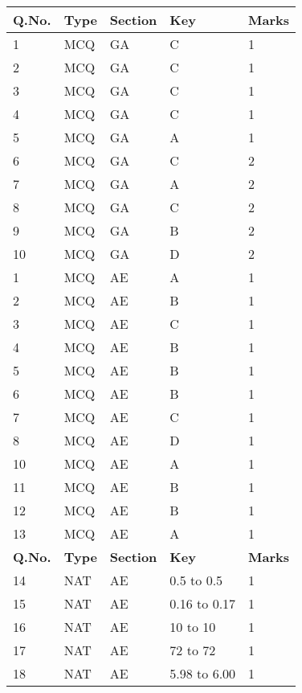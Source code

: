 \documentclass[12pt]{article}
\begin{document}
\begin{center}
	\begin{longtable}{|p{2.5cm}|p{2.5cm}|p{2.5cm}|p{6cm}|p{2.5cm}|}
		\hline
		\rowcolor{gray!30}
		\textbf{Q.No.} & \textbf{Type} & \textbf{Section} & \textbf{Key} & \textbf{Marks} \\
		\hline
		\endfirsthead
		\endhead

		1 & MCQ & GA & C & 1 \\
		\hline
		2 & MCQ & GA & C & 1 \\
		\hline
		3 & MCQ & GA & C & 1 \\
		\hline
		4 & MCQ & GA & C & 1 \\
		\hline
		5 & MCQ & GA & A & 1 \\
		\hline
		6 & MCQ & GA & C & 2 \\
		\hline
		7 & MCQ & GA & A & 2 \\
		\hline
		8 & MCQ & GA & C & 2 \\
		\hline
		9 & MCQ & GA & B & 2 \\
		\hline
		10 & MCQ & GA & D & 2 \\
		\hline
		1 & MCQ & AE & A & 1 \\
		\hline
		2 & MCQ & AE & B & 1 \\
		\hline
		3 & MCQ & AE & C & 1 \\
		\hline
		4 & MCQ & AE & B & 1 \\
		\hline
		5 & MCQ & AE & B & 1 \\
		\hline
		6 & MCQ & AE & B & 1 \\
		\hline
		7 & MCQ & AE & C & 1 \\
		\hline
		8 & MCQ & AE & D & 1 \\
		\hline
		10 & MCQ & AE & A & 1 \\
		\hline
		11 & MCQ & AE & B & 1 \\
		\hline
		12 & MCQ & AE & B & 1 \\
		\hline
		13 & MCQ & AE & A & 1 \\
		\hline
		\newpage	
		\rowcolor{gray!150}
		\textbf{Q.No.} & \textbf{Type} & \textbf{Section} & \textbf{Key} & \textbf{Marks} \\
		\hline
		14 & NAT & AE & 0.5 to 0.5 & 1 \\
		\hline
		15 & NAT & AE & 0.16 to 0.17 & 1 \\
		\hline
		16 & NAT & AE & 10 to 10 & 1 \\
		\hline
		17 & NAT & AE & 72 to 72 & 1 \\
		\hline
		18 & NAT & AE & 5.98 to 6.00 & 1 \\

\end{longtable}
\end{center}
\end{document}
